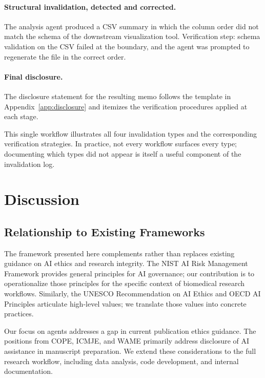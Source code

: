 \documentclass[11pt,letterpaper]{article}
\begin{document}
\paragraph{Structural invalidation, detected and corrected.} The analysis agent produced a CSV summary in which the column order did not match the schema of the downstream visualization tool. Verification step: schema validation on the CSV failed at the boundary, and the agent was prompted to regenerate the file in the correct order.

\paragraph{Final disclosure.} The disclosure statement for the resulting memo follows the template in Appendix~\ref{app:disclosure} and itemizes the verification procedures applied at each stage.

This single workflow illustrates all four invalidation types and the corresponding verification strategies. In practice, not every workflow surfaces every type; documenting which types did not appear is itself a useful component of the invalidation log.

\section{Discussion}
\label{sec:discussion}

\subsection{Relationship to Existing Frameworks}

The framework presented here complements rather than replaces existing guidance on AI ethics and research integrity. The NIST AI Risk Management Framework \cite{nist_rmf,nist_genai_profile} provides general principles for AI governance; our contribution is to operationalize those principles for the specific context of biomedical research workflows. Similarly, the UNESCO Recommendation on AI Ethics \cite{unesco_ai} and OECD AI Principles \cite{oecd_ai} articulate high-level values; we translate those values into concrete practices.

Our focus on agents addresses a gap in current publication ethics guidance. The positions from COPE, ICMJE, and WAME \cite{cope_ai,icmje_authorship,icmje_ai,wame2023} primarily address disclosure of AI assistance in manuscript preparation. We extend these considerations to the full research workflow, including data analysis, code development, and internal documentation.
\end{document}
